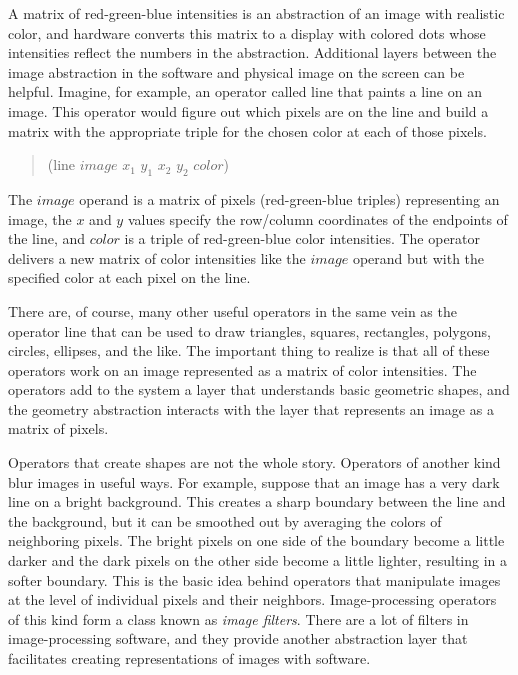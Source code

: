 A matrix of red-green-blue
intensities is an abstraction of an image with realistic color,
and hardware converts this matrix to a display with colored dots
whose intensities reflect the numbers in the abstraction.
Additional layers between the image abstraction in the software and
physical image on the screen can be helpful.
Imagine, for example, an operator called \textsf{line}
that paints a line on an image. This operator would figure out
which pixels are on the line and build a matrix with
the appropriate triple for the chosen color at each of those pixels.
\begin{quote}
    \textsf{(line} $image$ $x_1$ $y_1$ $x_2$ $y_2$ $color$\textsf{)}
\end{quote}
The $image$ operand is a matrix of pixels (red-green-blue triples)
representing an image, the $x$ and $y$ values
specify the row/column coordinates of the endpoints of the line,
and $color$ is a triple of red-green-blue color intensities.
The operator delivers a new matrix of color intensities
like the $image$ operand but with the specified color
at each pixel on the line.

There are, of course, many other useful operators in
the same vein as the operator \textsf{line} 
that can be used to draw
triangles, squares, rectangles, polygons, circles,
ellipses, and the like. The important thing to realize is that all of
these operators work on an image represented as a matrix of
color intensities.
The operators add to the system a layer that understands
basic geometric shapes, and the geometry abstraction
interacts with the layer that represents an image as a matrix of pixels.

Operators that create shapes are not the whole story.
Operators of another kind blur images in useful ways.
For example, suppose that an image has a
very dark line on a bright background. This creates a
sharp boundary between the line and the background, but it can be
smoothed out by averaging the colors of neighboring pixels.
The bright pixels on one side of the boundary become a little darker
and the dark pixels on the other side become a little lighter,
resulting in a softer boundary. This is the basic idea behind
operators that manipulate images at the level
of individual pixels and their neighbors. Image-processing operators
of this kind form a class  known as 
\emph{image filters}.
There are a lot of filters in image-processing software, 
and they provide another abstraction layer
that facilitates creating representations of images with software.


